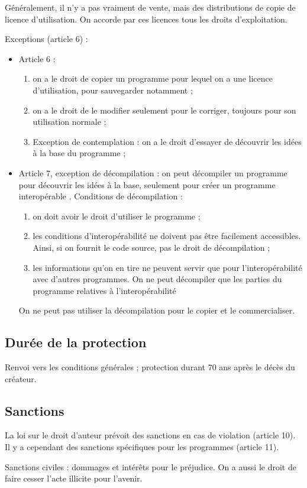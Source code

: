 		
		
		
		Généralement, il n'y a pas vraiment de vente, mais des distributions de copie de licence d'utilisation. On accorde par ces licences tous les droits d'exploitation.
		
		Exceptions (article 6) :
		
		\begin{itemize}
			\item Article 6 :
				\begin{enumerate}
			\item on a le droit de copier un programme pour lequel on a une licence d'utilisation, pour sauvegarder notamment ;
			\item on a le droit de le modifier seulement pour le corriger, toujours pour son utilisation normale ;
			\item Exception de contemplation : on a le droit d'essayer de découvrir les idées à la base du programme ;
				\end{enumerate}
			\item Article 7, exception de décompilation : on peut décompiler un programme pour découvrir les idées à la base, seulement pour créer un programme interopérable . Conditions de décompilation :
			
			\begin{enumerate}
				\item on doit avoir le droit d'utiliser le programme ;
				\item les conditions d'interopérabilité ne doivent pas être facilement accessibles. Ainsi, si on fournit le code source, pas le droit de décompilation ;
				\item les informations qu'on en tire ne peuvent servir que pour l'interopérabilité avec d'autres programmes. On ne peut décompiler que les parties du programme relatives à l'interopérabilité
			\end{enumerate}
			
			On ne peut pas utiliser la décompilation pour le copier et le commercialiser.
		\end{itemize}
				
				
		\subsection{Durée de la protection}
	
		Renvoi vers les conditions générales ; protection durant 70 ans après le décès du créateur.
		
		\subsection{Sanctions}
		
		La loi sur le droit d'auteur prévoit des sanctions en cas de violation (article 10). Il y a cependant des sanctions spécifiques pour les programmes (article 11).
		
		Sanctions civiles : dommages et intérêts pour le préjudice. On a aussi le droit de faire cesser l'acte illicite pour l'avenir. 
		
		
		
		